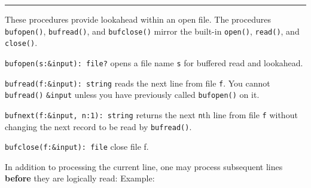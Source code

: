 


\vspace{0.25cm}\hrule{}

These procedures provide lookahead within an open file. The procedures
\texttt{bufopen()}, \texttt{bufread()}, and \texttt{bufclose()} mirror
the built-in \texttt{open()}, \texttt{read()}, and \texttt{close()}.

\texttt{bufopen(s:\&input): file?} opens a file name \texttt{s} for
buffered read and lookahead.

\texttt{bufread(f:\&input): string} reads the next line from file
\texttt{f}. You cannot \texttt{bufread()} \texttt{\&input} unless you
have previously called \texttt{bufopen()} on it.

\texttt{bufnext(f:\&input, n:1): string} returns the next \texttt{n}th
line from file \texttt{f} without changing the next record to be read
by \texttt{bufread()}.

\texttt{bufclose(f:\&input): file} close file f.

In addition to processing the current line, one may process subsequent
lines \textbf{before} they are logically read: Example:



